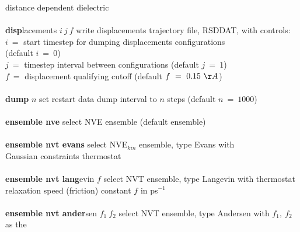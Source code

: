 \begin{tabbing}
\>                                              \> distance dependent dielectric \\
\>                                              \> \\
\> {\bf disp}lacements $i~j~f$                  \> write displacements trajectory file, RSDDAT, with controls: \\
\>                                              \> $i~=$ start timestep for dumping displacements configurations \\
\>                                              \> \phantom{xxx} (default $i~=~0$) \\
\>                                              \> $j~=$ timestep interval between configurations (default $j~=~1$) \\
\>                                              \> $f~=$ displacement qualifying cutoff (default $f~=~0.15~\AA$) \\
\>                                              \> \\
\> {\bf dump} $n$                               \> set restart data dump interval to $n$ steps (default $n~=~1000$) \\
\>                                              \> \\
\> {\bf ensemble nve}                           \> select NVE ensemble (default ensemble) \\
\>                                              \> \\
\> {\bf ensemble nvt evans}                     \> select NVE$_{kin}$ ensemble, type Evans with \\
\>                                              \> Gaussian constraints thermostat \\
\>                                              \> \\
\> {\bf ensemble nvt lang}evin $f$              \> select NVT ensemble, type Langevin with thermostat \\
\>                                              \> relaxation speed (friction) constant $f$ in ps$^{-1}$ \\
\>                                              \> \\
\> {\bf ensemble nvt ander}sen $f_{1}~f_{2}$    \> select NVT ensemble, type Andersen with $f_{1},~f_{2}$ as the \\

\end{tabbing}
